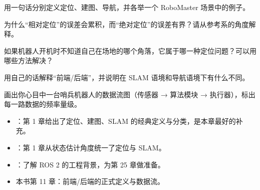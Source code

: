 \begin{problemset}

  \item 用一句话分别定义定位、建图、导航，并各举一个 RoboMaster 场景中的例子。
  \item 为什么“相对定位”的误差会累积，而“绝对定位”的误差有界？请从参考系的角度解释。
  \item 如果机器人开机时不知道自己在场地的哪个角落，它属于哪一种定位问题？可以用哪些方法解决？
  \item 用自己的话解释“前端/后端”，并说明在 SLAM 语境和导航语境下有什么不同。
  \item 画出你心目中一台哨兵机器人的数据流图（传感器 → 算法模块 → 执行器），标出每一路数据的频率量级。
\end{problemset}

\begin{reading}

\begin{itemize}
  \item \cite{thrun2005probabilistic}：第 1 章给出了定位、建图、SLAM 的经典定义与分类，是本章最好的补充。
  \item \cite{barfoot2017state}：第 1 章从状态估计角度统一了定位与 SLAM。
  \item \cite{macenski2022ros2}：了解 ROS 2 的工程背景，为第 25 章做准备。
  \item 本书第 11 章：前端/后端的正式定义与数据流。
\end{itemize}


\end{reading}


